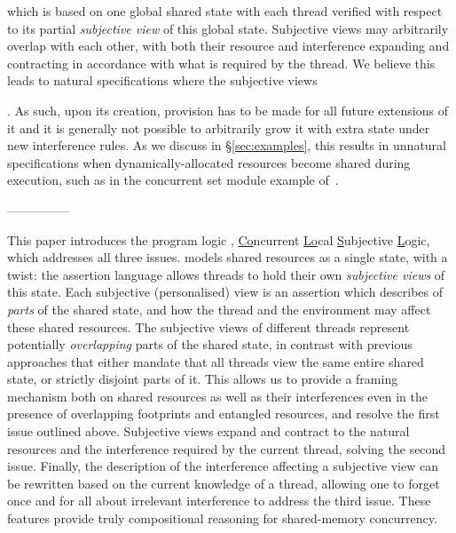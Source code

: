 which is based on one global shared state with
each thread verified with respect to its partial {\em subjective view}
of this global state. Subjective views may arbitrarily overlap with
each other, with both their resource and interference expanding and
contracting  in accordance with what is required by the thread.
We believe this leads to natural  specifications where the subjective
views 





. As such, upon its creation, provision
has to be made for all future extensions of it and it is generally not
possible to arbitrarily grow it with extra state under new
interference rules.  As we discuss in \S\ref{sec:examples}, this
results in unnatural specifications when dynamically-allocated
resources become shared during execution, such as in the concurrent
set module example of~\cite{cap-ecoop10}.

---------------



This paper introduces the program logic \colosl,
\underline{Co}ncurrent \underline{Lo}cal \underline{S}ubjective
\underline{L}ogic, which addresses all three issues. \colosl models
shared resources as a single state, with a twist: the assertion
language allows threads to hold their own \emph{subjective views} of
this state. Each subjective (personalised) view is an assertion which
describes of \emph{parts} of the shared state, and how the thread and
the environment may affect these shared resources.  The subjective
views of different threads represent potentially \emph{overlapping}
parts of the shared state, in contrast with previous approaches that
either mandate that all threads view the same entire shared state, or
strictly disjoint parts of it. This allows us to provide a framing
mechanism both on shared resources as well as their interferences even
in the presence of overlapping footprints and entangled resources, and
resolve the first issue outlined above. Subjective views expand and
contract to the natural resources and the interference required by the
current thread, solving the second issue. Finally, the description of
the interference affecting a subjective view can be rewritten based on
the current knowledge of a thread, allowing one to forget once and for
all about irrelevant interference to address the third issue. These
features provide truly compositional reasoning for shared-memory
concurrency.



